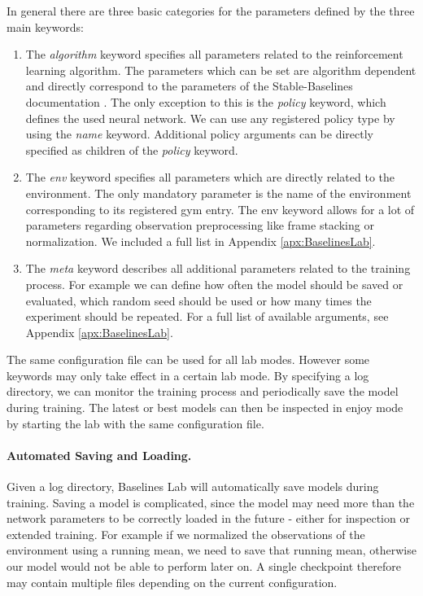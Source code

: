 In general there are three basic categories for the parameters defined by the three main keywords: 

\begin{enumerate}
    \item The \textit{algorithm} keyword specifies all parameters related to the reinforcement learning algorithm. The parameters which can be set are algorithm dependent and directly correspond to the parameters of the Stable-Baselines documentation \cite{stable-baselines-docs}. The only exception to this is the \textit{policy} keyword, which defines the used neural network. We can use any registered policy type by using the \textit{name} keyword. Additional policy arguments can be directly specified as children of the \textit{policy} keyword.
    \item The \textit{env} keyword specifies all parameters which are directly related to the environment. The only mandatory parameter is the name of the environment corresponding to its registered gym entry. The env keyword allows for a lot of parameters regarding observation preprocessing like frame stacking or normalization. We included a full list in Appendix \ref{apx:BaselinesLab}. 
    \item  The \textit{meta} keyword describes all additional parameters related to the training process. For example we can define how often the model should be saved or evaluated, which random seed should be used or how many times the experiment should be repeated. For a full list of available arguments, see Appendix \ref{apx:BaselinesLab}.
\end{enumerate}

The same configuration file can be used for all lab modes. However some keywords may only take effect in a certain lab mode. By specifying a log directory, we can monitor the training process and periodically save the model during training. The latest or best models can then be inspected in enjoy mode by starting the lab with the same configuration file. 

\paragraph{Automated Saving and Loading.}
Given a log directory, Baselines Lab will automatically save models during training. Saving a model is complicated, since the model may need more than the network parameters to be correctly loaded in the future - either for inspection or extended training. For example if we normalized the observations of the environment using a running mean, we need to save that running mean, otherwise our model would not be able to perform later on. A single checkpoint therefore may contain multiple files depending on the current configuration.


